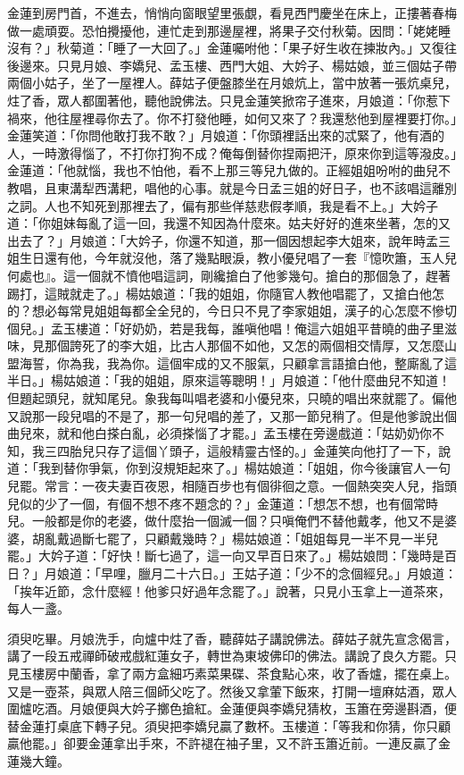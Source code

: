 金蓮到房門首，不進去，悄悄向窗眼望里張覷，看見西門慶坐在床上，正摟著春梅做一處頑耍。恐怕攪擾他，連忙走到那邊屋裡，將果子交付秋菊。因問：「姥姥睡沒有？」秋菊道：「睡了一大回了。」金蓮囑咐他：「果子好生收在揀妝內。」又復往後邊來。只見月娘、李嬌兒、孟玉樓、西門大姐、大妗子、楊姑娘，並三個姑子帶兩個小姑子，坐了一屋裡人。薛姑子便盤膝坐在月娘炕上，當中放著一張炕桌兒，炷了香，眾人都圍著他，聽他說佛法。只見金蓮笑掀帘子進來，月娘道：「你惹下禍來，他往屋裡尋你去了。你不打發他睡，如何又來了？我還愁他到屋裡要打你。」金蓮笑道：「你問他敢打我不敢？」月娘道：「你頭裡話出來的忒緊了，他有酒的人，一時激得惱了，不打你打狗不成？俺每倒替你捏兩把汗，原來你到這等潑皮。」金蓮道：「他就惱，我也不怕他，看不上那三等兒九做的。正經姐姐吩咐的曲兒不教唱，且東溝犁西溝耙，唱他的心事。就是今日孟三姐的好日子，也不該唱這離別之詞。人也不知死到那裡去了，偏有那些佯慈悲假孝順，我是看不上。」大妗子道：「你姐妹每亂了這一回，我還不知因為什麼來。姑夫好好的進來坐著，怎的又出去了？」月娘道：「大妗子，你還不知道，那一個因想起李大姐來，說年時孟三姐生日還有他，今年就沒他，落了幾點眼淚，教小優兒唱了一套『憶吹簫，玉人兒何處也』。這一個就不憤他唱這詞，剛纔搶白了他爹幾句。搶白的那個急了，趕著踢打，這賊就走了。」楊姑娘道：「我的姐姐，你隨官人教他唱罷了，又搶白他怎的？想必每常見姐姐每都全全兒的，今日只不見了李家姐姐，漢子的心怎麼不慘切個兒。」孟玉樓道：「好奶奶，若是我每，誰嗔他唱！俺這六姐姐平昔曉的曲子里滋味，見那個誇死了的李大姐，比古人那個不如他，又怎的兩個相交情厚，又怎麼山盟海誓，你為我，我為你。這個牢成的又不服氣，只顧拿言語搶白他，整廝亂了這半日。」楊姑娘道：「我的姐姐，原來這等聰明！」月娘道：「他什麼曲兒不知道！但題起頭兒，就知尾兒。象我每叫唱老婆和小優兒來，只曉的唱出來就罷了。偏他又說那一段兒唱的不是了，那一句兒唱的差了，又那一節兒稍了。但是他爹說出個曲兒來，就和他白搽白亂，必須搽惱了才罷。」孟玉樓在旁邊戲道：「姑奶奶你不知，我三四胎兒只存了這個丫頭子，這般精靈古怪的。」金蓮笑向他打了一下，說道：「我到替你爭氣，你到沒規矩起來了。」楊姑娘道：「姐姐，你今後讓官人一句兒罷。常言：一夜夫妻百夜恩，相隨百步也有個徘徊之意。一個熱突突人兒，指頭兒似的少了一個，有個不想不疼不題念的？」金蓮道：「想怎不想，也有個常時兒。一般都是你的老婆，做什麼抬一個滅一個？只嗔俺們不替他戴孝，他又不是婆婆，胡亂戴過斷七罷了，只顧戴幾時？」楊姑娘道：「姐姐每見一半不見一半兒罷。」大妗子道：「好快！斷七過了，這一向又早百日來了。」楊姑娘問：「幾時是百日？」月娘道：「早哩，臘月二十六日。」王姑子道：「少不的念個經兒。」月娘道：「挨年近節，念什麼經！他爹只好過年念罷了。」說著，只見小玉拿上一道茶來，每人一盞。

須臾吃畢。月娘洗手，向爐中炷了香，聽薛姑子講說佛法。薛姑子就先宣念偈言，講了一段五戒禪師破戒戲紅蓮女子，轉世為東坡佛印的佛法。講說了良久方罷。只見玉樓房中蘭香，拿了兩方盒細巧素菜果碟、茶食點心來，收了香爐，擺在桌上。又是一壺茶，與眾人陪三個師父吃了。然後又拿葷下飯來，打開一壇麻姑酒，眾人圍爐吃酒。月娘便與大妗子擲色搶紅。金蓮便與李嬌兒猜枚，玉簫在旁邊斟酒，便替金蓮打桌底下轉子兒。須臾把李嬌兒贏了數杯。玉樓道：「等我和你猜，你只顧贏他罷。」卻要金蓮拿出手來，不許褪在袖子里，又不許玉簫近前。一連反贏了金蓮幾大鐘。

